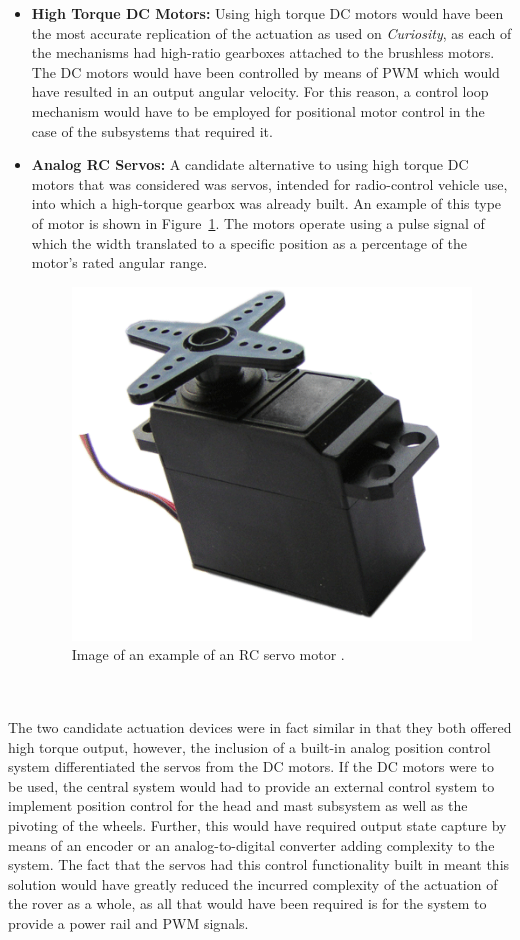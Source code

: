       \begin{itemize}
        \item \textbf{High Torque DC Motors:} Using high torque DC motors would have been the most accurate replication of the actuation as used on \textit{Curiosity}, as each of the mechanisms had high-ratio gearboxes attached to the brushless motors. The DC motors would have been controlled by means of PWM which would have resulted in an output angular velocity. For this reason, a control loop mechanism would have to be employed for positional motor control in the case of the subsystems that required it.
        \item \textbf{Analog RC Servos:} A candidate alternative to using high torque DC motors that was considered was servos, intended for radio-control vehicle use, into which a high-torque gearbox was already built. An example of this type of motor is shown in Figure~\ref{fig:concepts-servoMotorExample}. The motors operate using a pulse signal of which the width translated to a specific position as a percentage of the motor's rated angular range.
        
        \begin{figure}[H]
          \centering
          \includegraphics[width=0.3\linewidth]{figures/concepts-servoMotorExample}
          \caption[Image of an example of an RC servo motor.]{Image of an example of an RC servo motor \cite{fig:concepts-servoMotorExample_cite}.}
          \label{fig:concepts-servoMotorExample}
        \end{figure}

      \end{itemize}
      
      \\\\
        The two candidate actuation devices were in fact similar in that they both offered high torque output, however, the inclusion of a built-in analog position control system differentiated the servos from the DC motors. If the DC motors were to be used, the central system would had to provide an external control system to implement position control for the head and mast subsystem as well as the pivoting of the wheels. Further, this would have required output state capture by means of an encoder or an analog-to-digital converter adding complexity to the system. The fact that the servos had this control functionality built in meant this solution would have greatly reduced the incurred complexity of the actuation of the rover as a whole, as all that would have been required is for the system to provide a power rail and PWM signals.
        
